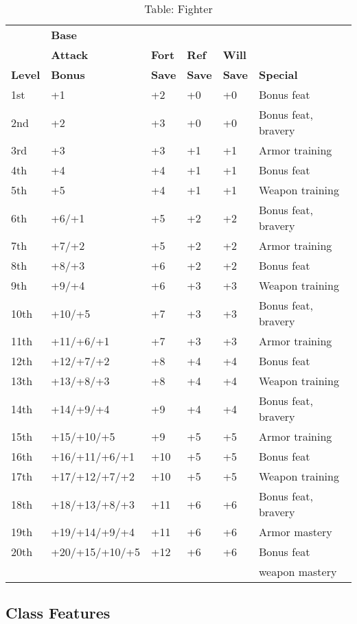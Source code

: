 \begin{table}[]
\sffamily
\setlength{\tabcolsep}{1pt}
\caption{Table: Fighter}
\begin{tabular}{llllll}
               & \textbf{Base}\\
               & \textbf{Attack} & \textbf{Fort} & \textbf{Ref} & \textbf{Will}\\
\textbf{Level} & \textbf{Bonus} & \textbf{Save} & \textbf{Save} & \textbf{Save} & \textbf{Special}\\
1st & +1 & +2 & +0 & +0 & Bonus feat\\
2nd & +2 & +3 & +0 & +0 & Bonus feat, bravery\\
3rd & +3 & +3 & +1 & +1 & Armor training\\
4th & +4 & +4 & +1 & +1 & Bonus feat\\
5th & +5 & +4 & +1 & +1 & Weapon training\\
6th & +6/+1 & +5 & +2 & +2 & Bonus feat, bravery\\
7th & +7/+2 & +5 & +2 & +2 & Armor training\\
8th & +8/+3 & +6 & +2 & +2 & Bonus feat\\
9th & +9/+4 & +6 & +3 & +3 & Weapon training\\
10th & +10/+5 & +7 & +3 & +3 & Bonus feat, bravery\\
11th & +11/+6/+1 & +7 & +3 & +3 & Armor training\\
12th & +12/+7/+2 & +8 & +4 & +4 & Bonus feat\\
13th & +13/+8/+3 & +8 & +4 & +4 & Weapon training\\
14th & +14/+9/+4 & +9 & +4 & +4 & Bonus feat, bravery\\
15th & +15/+10/+5 & +9 & +5 & +5 & Armor training\\
16th & +16/+11/+6/+1 & +10 & +5 & +5 & Bonus feat\\
17th & +17/+12/+7/+2 & +10 & +5 & +5 & Weapon training\\
18th & +18/+13/+8/+3 & +11 & +6 & +6 & Bonus feat, bravery\\
19th & +19/+14/+9/+4 & +11 & +6 & +6 & Armor mastery\\
20th & +20/+15/+10/+5 & +12 & +6 & +6 & Bonus feat \\
     &                &     &    &    & weapon mastery\\
\end{tabular}
\end{table}
				
\subsection{Class Features}

